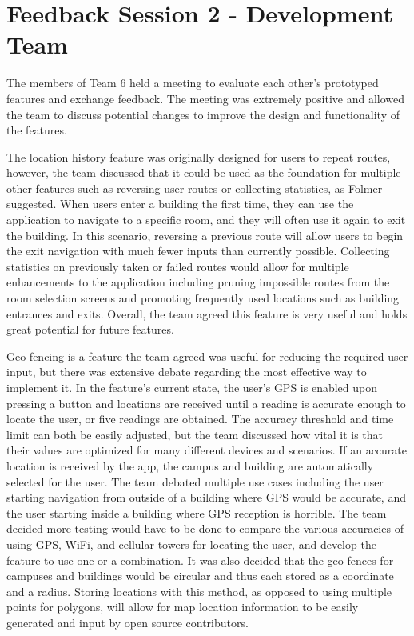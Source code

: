 \documentclass{scrreprt}
\begin{document}
\pagebreak

\section{Feedback Session 2 - Development Team}

The members of Team 6 held a meeting to evaluate each other’s prototyped features and exchange feedback. The meeting was extremely positive and allowed the team to discuss potential changes to improve the design and functionality of the features.

	The location history feature was originally designed for users to repeat routes, however, the team discussed that it could be used as the foundation for multiple other features such as reversing user routes or collecting statistics, as Folmer suggested. When users enter a building the first time, they can use the application to navigate to a specific room, and they will often use it again to exit the building. In this scenario, reversing a previous route will allow users to begin the exit navigation with much fewer inputs than currently possible. Collecting statistics on previously taken or failed routes would allow for multiple enhancements to the application including pruning impossible routes from the room selection screens and promoting frequently used locations such as building entrances and exits. Overall, the team agreed this feature is very useful and holds great potential for future features.
	
Geo-fencing is a feature the team agreed was useful for reducing the required user input, but there was extensive debate regarding the most effective way to implement it. In the feature’s current state, the user's GPS is enabled upon pressing a button and locations are received until a reading is accurate enough to locate the user, or five readings are obtained. The accuracy threshold and time limit can both be easily adjusted, but the team discussed how vital it is that their values are optimized for many different devices and scenarios. If an accurate location is received by the app, the campus and building are automatically selected for the user. The team debated multiple use cases including the user starting navigation from outside of a building where GPS would be accurate, and the user starting inside a building where GPS reception is horrible. The team decided more testing would have to be done to compare the various accuracies of using GPS, WiFi, and cellular towers for locating the user, and develop the feature to use one or a combination. It was also decided that the geo-fences for campuses and buildings would be circular and thus each stored as a coordinate and a radius. Storing locations with this method, as opposed to using multiple points for polygons, will allow for map location information to be easily generated and input by open source contributors.
\end{document}
